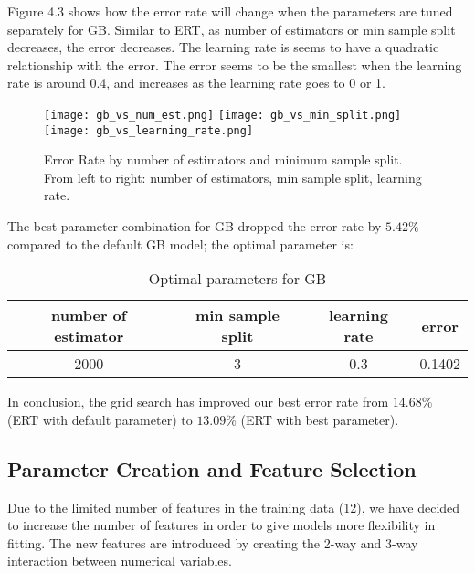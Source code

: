 \documentclass[11pt]{article}
\begin{document}
\noindent Figure 4.3 shows how the error rate will change when the parameters are tuned separately for GB. Similar to ERT, as number of estimators or min sample split decreases, the error decreases. The learning rate is seems to have a quadratic relationship with the error. The error seems to be the smallest when the learning rate is around 0.4, and increases as the learning rate goes to 0 or 1. \\

\begin{figure}[ht]
\label{gb_grid}
\begin{center}
\texttt{[image: gb\_vs\_num\_est.png]}
\texttt{[image: gb\_vs\_min\_split.png]}
\texttt{[image: gb\_vs\_learning\_rate.png]}
\end{center}
\caption{Error Rate by number of estimators and minimum sample split. From left to right: number of estimators, min sample split, learning rate.}
\end{figure}

\noindent The best parameter combination for GB dropped the error rate by $5.42\%$ compared to the default GB model; the optimal parameter is:

\begin{table}[ht]
    \label{best_gb}
    \centering
    \begin{tabular}{c|c|c|c}
        \hline
        \textbf{number of estimator} & \textbf{min sample split} & \textbf{learning rate} & \textbf{error} \\ \hline
        2000 & 3 & 0.3 & 0.1402 \\
        \hline
    \end{tabular}
    \caption{Optimal parameters for GB}
\end{table}

\noindent In conclusion, the grid search has improved our best error rate from $14.68\%$ (ERT with default parameter) to $13.09\%$ (ERT with best parameter).

\newpage 

\subsection{Parameter Creation and Feature Selection}
Due to the limited number of features in the training data (12), we have decided to increase the number of features in order to give models more flexibility in fitting. The new features are introduced by creating the 2-way and 3-way interaction between numerical variables.\\
\end{document}
